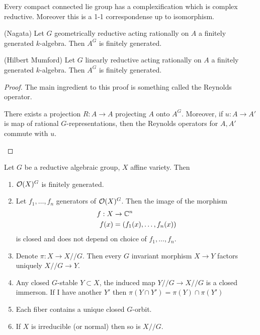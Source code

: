 \documentclass[12pt]{article}
\begin{document}
\begin{fact}
    Every compact connected lie group has a complexification which is complex reductive. Moreover this is a 1-1 correspondense up to isomorphism.
\end{fact}
\begin{theorem}
    (Nagata) Let $G$ geometrically reductive acting rationally on $A$ a finitely generated $k$-algebra. Then $A^G$ is finitely generated.
\end{theorem}
\begin{theorem}
    (Hilbert Mumford) Let $G$ linearly reductive acting rationally on $A$ a finitely generated $k$-algebra. Then $A^G$ is finitely generated.
\end{theorem}
\begin{proof}
    The main ingredient to this proof is something called the Reynolds operator.
    \begin{lemma}
        There exists a projection $R:A\to A$ projecting $A$ onto $A^G$. Moreover, if $u:A\to A'$ is map of rational $G$-representations, then the Reynolds operators for $A,A'$ commute with $u$.
    \end{lemma}
\end{proof}
\begin{theorem}
    Let $G$ be a reductive algebraic group, $X$ affine variety. Then \begin{enumerate}
        \item $\mathcal{O}(X)^G$ is finitely generated.
        \item Let $f_1,\dots,f_n$ generators of $\mathcal{O}(X)^G$. Then the image of the morphism \begin{align*}
            f:X&\to\mathbb{C}^n \\
            f(x) &= (f_1(x),\dots,f_n(x))
        \end{align*} is closed and does not depend on choice of $f_1,\dots,f_n$.
        \item Denote $\pi:X\to X//G$. Then every $G$ invariant morphism $X\to Y$ factors uniquely $X//G\to Y$.
        \item Any closed $G$-stable $Y\subset X$, the induced map $Y//G\to X//G$ is a closed immerson. If I have another $Y'$ then $\pi(Y\cap Y') = \pi(Y) \cap \pi(Y')$
        \item Each fiber contains a unique closed $G$-orbit.
        \item If $X$ is irreducible (or normal) then so is $X//G$.
    \end{enumerate}
\end{theorem}
\end{document}

